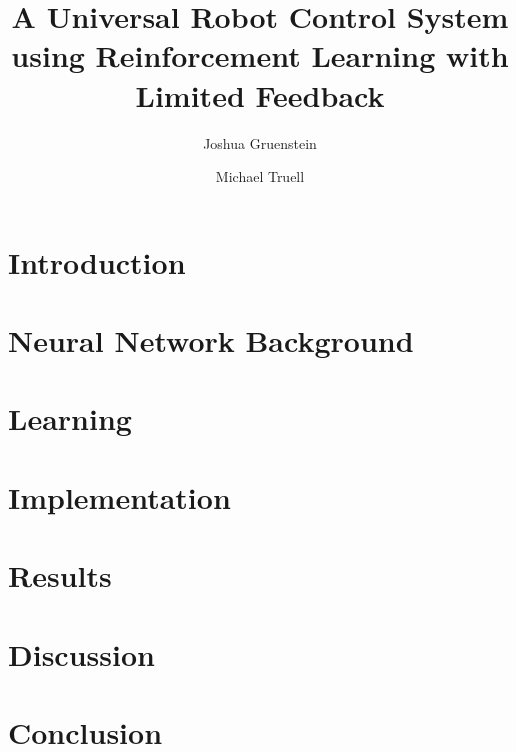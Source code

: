 \documentclass[letterpaper,11pt]{article}
\title{A Universal Robot Control System using Reinforcement Learning with Limited Feedback}
\author{Joshua Gruenstein \and Michael Truell}
\begin{document}
\maketitle



\pagebreak

\section{Introduction}



\section{Neural Network Background}



\section{Learning}



\section{Implementation}



\section{Results}



\section{Discussion}



\section{Conclusion}



\nocite{gaskett,geoffrey,werbos,dini,macleod,dongsoo,dudek,watkins,rummery,baird}

\pagebreak


\end{document}
